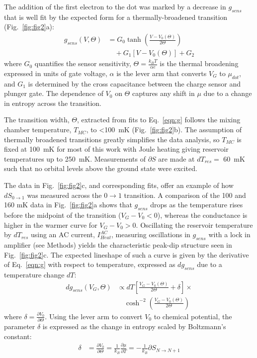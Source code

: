 \documentclass[twocolumn,showpacs,preprintnumbers,amsmath,amssymb,pra,aps,superscriptaddress]{revtex4-1}
\begin{document}
The addition of the first electron to the dot was marked by a decrease in $g_{sens}$ that is well fit by the expected form for a thermally-broadened transition (Fig.~\ref{fig:fig2}a):
%
\begin{align}
\label{eqn:g}
        g_{sens}(V,\Theta) &= G_0 \tanh\left(\frac{V-V_0(\Theta)}{2\Theta}\right)  \\
                        &\quad + G_1\left[V-V_0(\Theta)\right] + G_2 \nonumber
\end{align}
%
where $G_0$ quantifies the sensor sensitivity, $\Theta = \frac{k_B T}{\alpha e}$ is the thermal broadening expressed in units of gate voltage, $\alpha$ is the lever arm that converts $V_G$ to $\mu_{dot}$, and $G_1$ is determined by the cross capacitance between the charge sensor and plunger gate. The dependence of $V_0$ on $\Theta$ captures any shift in $\mu$ due to a change in entropy across the transition.

The transition width, $\Theta$, extracted from fits to Eq.~\ref{eqn:g} follows the mixing chamber temperature, $T_{MC}$, to \SI{<100}{\milli\kelvin} (Fig.~\ref{fig:fig2}b). The assumption of thermally broadened transitions greatly simplifies the data analysis, so $T_{MC}$ is fixed at \SI{100}{\milli\kelvin} for most of this work with Joule heating giving reservoir temperatures up to \SI{250}{\milli\kelvin}. Measurements of $\partial S$ are made at $dT_{res} = $ \SI{60}{\milli\kelvin} such that no orbital levels above the ground state were excited.

The data in Fig.~\ref{fig:fig2}c, and corresponding fits, offer an example of how $dS_{0\rightarrow 1}$ was measured across the $0 \rightarrow 1$ transition. A comparison of the 100 and 160 mK data in Fig.~\ref{fig:fig2}a shows that $g_{sens}$ drops as the temperature rises before the midpoint of the transition ($V_G-V_0<0$), whereas the conductance is higher in the warmer curve for $V_G-V_0>0$.   Oscillating the reservoir temperature by $dT_{res}$ using an AC current, $I^{AC}_{Heat}$, measuring oscillations in $g_{sens}$ with a lock in amplifier (see Methods) yields the characteristic peak-dip structure seen in Fig.~\ref{fig:fig2}c.  The expected lineshape of such a curve is given by the derivative of Eq.~\ref{eqn:g} with respect to temperature, expressed as $dg_{sens}$ due to a temperature change $dT$:
%
\begin{align}
\label{eqn:dg}
        dg_{sens}(V_G, \Theta) &\propto dT \left[ \frac{V_G-V_{0}(\Theta)}{2\Theta} +\delta \right]\times \\
        				      &\quad\cosh^{-2}\left(\frac{V_G-V_{0}(\Theta)}{2\Theta}\right) \nonumber
\end{align}
%
where $\delta=\frac{\partial V_0}{\partial \Theta}$. Using the lever arm to convert $V_0$ to chemical potential, the parameter $\delta$ is expressed as the change in entropy scaled by Boltzmann's constant:
%
\begin{align}
\label{eqn:delta}
        \delta &= \frac{\partial V_0}{\partial \Theta} = 
        \frac{1}{k_B} \frac{\partial \mu}{\partial T} = 
        -\frac{1}{k_B} \partial S_{N\rightarrow N+1}
\end{align}
%
\end{document}
